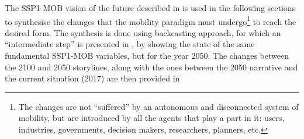 The SSP1-MOB vision of the future described in  is used in the following sections to synthesise the changes that the mobility paradigm must undergo\footnote{The changes are not ``suffered'' by an autonomous and disconnected system of mobility, but are introduced by all the agents that play a part in it: users, industries, governments, decision makers, researchers, planners, etc.} to reach the desired form. The synthesis is done using backcasting approach, for which an ``intermediate step'' is presented in , by showing the state of the same fundamental SSP1-MOB variables, but for the year 2050. The changes between the 2100 and 2050 storylines, along with the ones between the 2050 narrative and the current situation (2017) are then provided in 

